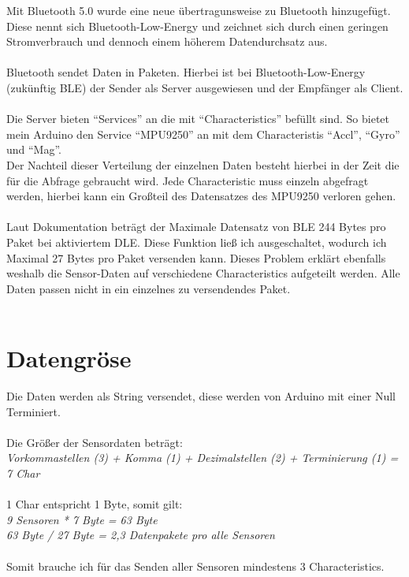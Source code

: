 Mit Bluetooth 5.0 wurde eine neue übertragunsweise zu 
Bluetooth hinzugefügt. Diese nennt sich Bluetooth-Low-Energy und zeichnet
sich durch einen geringen Stromverbrauch und dennoch einem höherem 
Datendurchsatz aus. \\
\\
Bluetooth sendet Daten in Paketen. Hierbei ist bei Bluetooth-Low-Energy
(zukünftig BLE) der Sender als Server ausgewiesen und der Empfänger als Client.\\
\\
Die Server bieten ``Services'' an die mit ``Characteristics'' befüllt sind.
So bietet mein Arduino den Service ``MPU9250'' an mit dem Characteristis ``Accl'', ``Gyro''
und ``Mag''.\\
Der Nachteil dieser Verteilung der einzelnen Daten besteht hierbei in der Zeit die für die
Abfrage gebraucht wird. Jede Characteristic muss einzeln abgefragt werden, hierbei kann ein
Großteil des Datensatzes des MPU9250 verloren gehen.\\
\\
Laut Dokumentation beträgt der Maximale Datensatz von BLE 244 Bytes pro Paket bei 
aktiviertem DLE. Diese Funktion ließ ich ausgeschaltet, wodurch ich Maximal
27 Bytes pro Paket versenden kann. Dieses Problem erklärt ebenfalls weshalb die Sensor-Daten
auf verschiedene Characteristics aufgeteilt werden. Alle Daten passen nicht in ein einzelnes
zu versendendes Paket. \\
\\

\section{Datengröse}
Die Daten werden als String versendet, diese werden von Arduino mit einer
Null Terminiert. \\
\\
Die Größer der Sensordaten beträgt:\\
\textit{Vorkommastellen (3) + Komma (1) + Dezimalstellen (2) + Terminierung (1) = 7 Char}\\
\\
1 Char entspricht 1 Byte, somit gilt:\\
\textit{
9 Sensoren * 7 Byte = 63 Byte \\
63 Byte / 27 Byte = 2,3 Datenpakete pro alle Sensoren
}\\
\\
Somit brauche ich für das Senden aller Sensoren mindestens 3 Characteristics.


